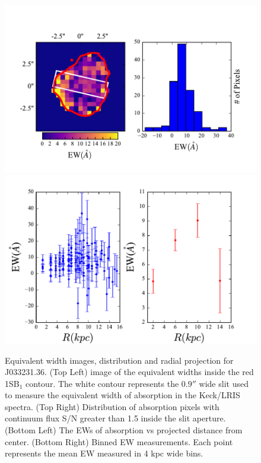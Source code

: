 \documentclass[twocolumn]{aastex61}
\begin{document}
\begin{figure}[]
\centering
\includegraphics[scale=0.9]{../Figures/J36EW.pdf}
\includegraphics[scale=0.9]{../Figures/J36EW_2.pdf}
\caption{Equivalent width images, distribution and radial projection for J033231.36. (Top Left) image of the  equivalent widths inside the red 1SB$_1$ contour. The white contour represents the $0.9''$ wide  slit used to measure the equivalent width of absorption in the Keck/LRIS spectra.  (Top Right) Distribution of absorption pixels with continuum flux S/N greater than 1.5 inside the slit aperture. (Bottom Left) The EWs of absorption vs projected distance from center. (Bottom Right) Binned EW measurements. Each point represents the mean EW measured in 4 kpc wide bins.}
\label{fig:ew22}
\end{figure}
\end{document}

